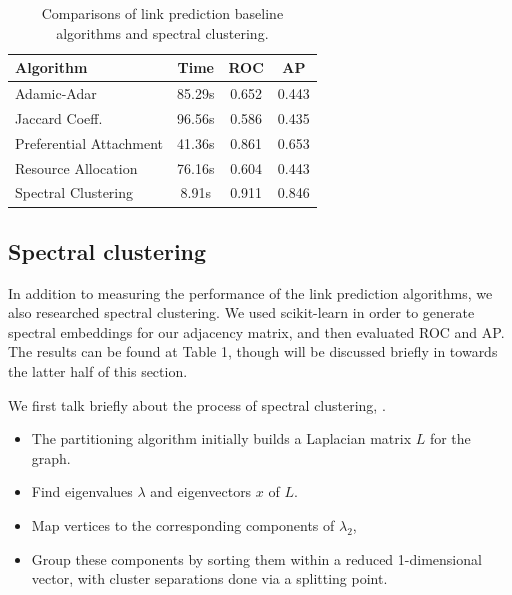 \documentclass[10pt,twocolumn,letterpaper]{article}
\begin{document}
\begin{table}
\begin{center}
\begin{tabular}{|l|c|c|c|}
\hline
Algorithm & Time & ROC & AP \\
\hline\hline
Adamic-Adar & 85.29s &  0.652 & 0.443\\
Jaccard Coeff. & 96.56s & 0.586 & 0.435 \\
Preferential Attachment & 41.36s & 0.861 & 0.653 \\
Resource Allocation & 76.16s & 0.604 & 0.443 \\
Spectral Clustering & 8.91s & 0.911 & 0.846 \\
\hline
\end{tabular}
\end{center}
\caption{Comparisons of link prediction baseline algorithms and spectral clustering.}
\label{tab:contributions}
\end{table}





\subsection{Spectral clustering}

In addition to measuring the performance of the link prediction algorithms, we also researched spectral clustering. We used scikit-learn in order to generate spectral embeddings for our adjacency matrix, and then evaluated ROC and AP. The results can be found at Table 1, though will be discussed briefly in towards the latter half of this section.
    
We first talk briefly about the process of spectral clustering, \cite{Ng01onspectral}. 

\begin{itemize}
    \item The partitioning algorithm initially builds a Laplacian matrix $L$ for the graph.
    \item Find eigenvalues $\lambda$ and eigenvectors $x$ of $L$.
    \item Map vertices to the corresponding components of $\lambda_2$,
    \item Group these components by sorting them within a reduced 1-dimensional vector, with cluster separations done via a splitting point.
\end{itemize}  
\end{document}
